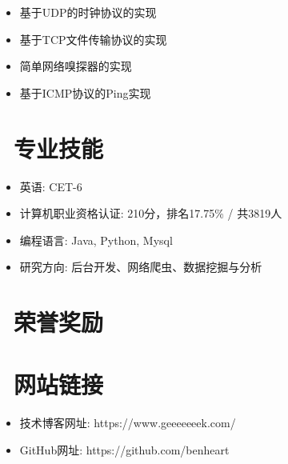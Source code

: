 \documentclass{resume}
\begin{document}
    \begin{onehalfspacing}
        \begin{itemize}
            \item 基于UDP的时钟协议的实现
            \item 基于TCP文件传输协议的实现
            \item 简单网络嗅探器的实现
            \item 基于ICMP协议的Ping实现
        \end{itemize}
    \end{onehalfspacing}
    \blankline{ }

    \section{\faCogs\ 专业技能}
    \begin{itemize}[parsep=0.5ex]
        \item 英语: CET-6
        \item 计算机职业资格认证: 210分，排名17.75\% / 共3819人
        \item 编程语言: Java, Python, Mysql
        \item 研究方向: 后台开发、网络爬虫、数据挖掘与分析
    \end{itemize}
    \blankline{ }

    \section{\faTrophy\ 荣誉奖励}
    \blankline{ }

    \section{\faLink\ 网站链接}
    \begin{itemize}[parsep=0.5ex]
        \item 技术博客网址: https://www.geeeeeeek.com/
        \item GitHub网址: https://github.com/benheart
    \end{itemize}
\end{document}
